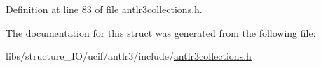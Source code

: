 Definition at line 83 of file antlr3collections.\-h.



The documentation for this struct was generated from the following file\-:\begin{DoxyCompactItemize}
\item 
libs/structure\-\_\-\-I\-O/ucif/antlr3/include/\hyperlink{antlr3collections_8h}{antlr3collections.\-h}\end{DoxyCompactItemize}
